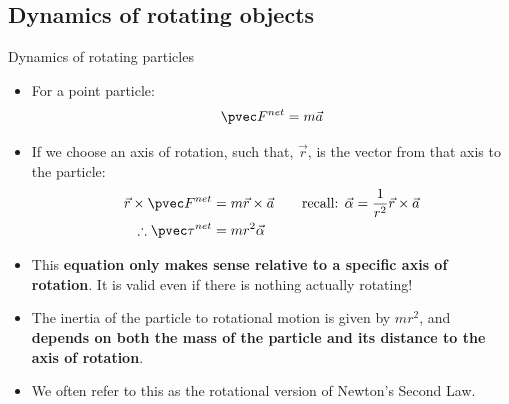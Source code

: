 \documentclass[aspectratio=169,
hyperref={colorlinks,urlcolor=blue}
]{beamer}
\begin{document}





\subsection{Dynamics of rotating objects}
\label{subsec:dynamicsofrotatingobjects}
\begin{frame}{Dynamics of rotating particles}
\begin{itemize}
\item For a point particle:
\begin{align*}
\pvec F^{net} = m\vec a
\end{align*}
\item If we choose an axis of rotation, such that, $\vec r$, is the vector from that axis to the particle:
\begin{align*}
\vec r \times \pvec F^{net} &= m\vec r \times\vec a \quad \quad \text{recall: } \vec \alpha=\frac{1}{r^2}\vec r \times \vec a\\
\therefore \pvec \tau^{net} &= mr^2\vec \alpha
\end{align*}
\item This \textbf{equation only makes sense relative to a specific axis of rotation}. It is valid even if there is nothing actually rotating!
\item The inertia of the particle to rotational motion is given by $mr^2$, and \textbf{depends on both the mass of the particle and its distance to the axis of rotation}.
\item We often refer to this as the rotational version of Newton's Second Law.
\end{itemize}
\end{frame}


\end{document}
